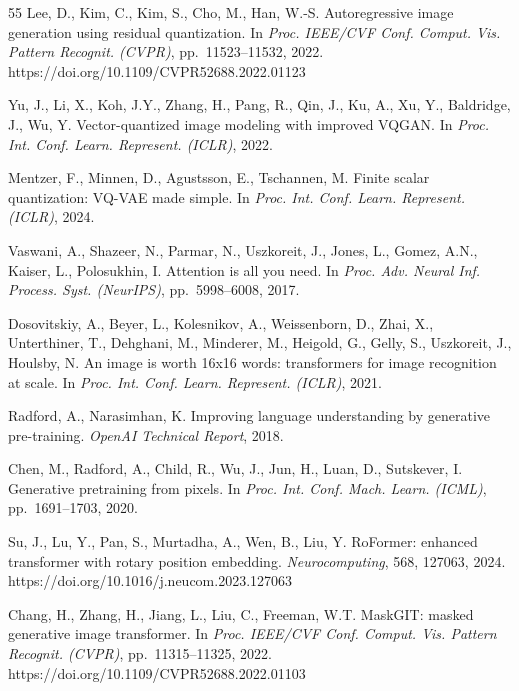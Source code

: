 \documentclass[lettersize,journal]{IEEEtran}
\begin{document}
\begin{thebibliography}{55}
Lee, D., Kim, C., Kim, S., Cho, M., Han, W.-S. Autoregressive image generation using residual quantization. In \textit{Proc. IEEE/CVF Conf. Comput. Vis. Pattern Recognit. (CVPR)}, pp.~11523--11532, 2022. https://doi.org/10.1109/CVPR52688.2022.01123

Yu, J., Li, X., Koh, J.Y., Zhang, H., Pang, R., Qin, J., Ku, A., Xu, Y., Baldridge, J., Wu, Y. Vector-quantized image modeling with improved VQGAN. In \textit{Proc. Int. Conf. Learn. Represent. (ICLR)}, 2022.

Mentzer, F., Minnen, D., Agustsson, E., Tschannen, M. Finite scalar quantization: VQ-VAE made simple. In \textit{Proc. Int. Conf. Learn. Represent. (ICLR)}, 2024.


Vaswani, A., Shazeer, N., Parmar, N., Uszkoreit, J., Jones, L., Gomez, A.N., Kaiser, L., Polosukhin, I. Attention is all you need. In \textit{Proc. Adv. Neural Inf. Process. Syst. (NeurIPS)}, pp.~5998--6008, 2017.

Dosovitskiy, A., Beyer, L., Kolesnikov, A., Weissenborn, D., Zhai, X., Unterthiner, T., Dehghani, M., Minderer, M., Heigold, G., Gelly, S., Uszkoreit, J., Houlsby, N. An image is worth 16x16 words: transformers for image recognition at scale. In \textit{Proc. Int. Conf. Learn. Represent. (ICLR)}, 2021.

Radford, A., Narasimhan, K. Improving language understanding by generative pre-training. \textit{OpenAI Technical Report}, 2018.

Chen, M., Radford, A., Child, R., Wu, J., Jun, H., Luan, D., Sutskever, I. Generative pretraining from pixels. In \textit{Proc. Int. Conf. Mach. Learn. (ICML)}, pp.~1691--1703, 2020.

Su, J., Lu, Y., Pan, S., Murtadha, A., Wen, B., Liu, Y. RoFormer: enhanced transformer with rotary position embedding. \textit{Neurocomputing}, 568, 127063, 2024. https://doi.org/10.1016/j.neucom.2023.127063

Chang, H., Zhang, H., Jiang, L., Liu, C., Freeman, W.T. MaskGIT: masked generative image transformer. In \textit{Proc. IEEE/CVF Conf. Comput. Vis. Pattern Recognit. (CVPR)}, pp.~11315--11325, 2022. https://doi.org/10.1109/CVPR52688.2022.01103


\end{thebibliography}
\end{document}
